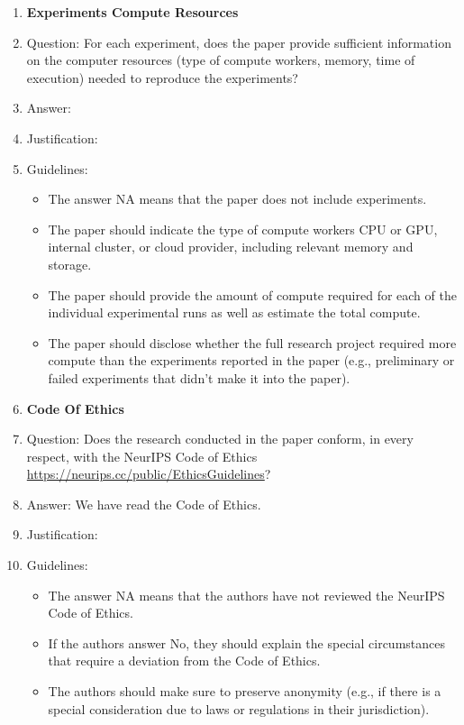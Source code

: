 \begin{enumerate}
\item {\bf Experiments Compute Resources}
\item[] Question: For each experiment, does the paper provide sufficient information on the computer resources (type of compute workers, memory, time of execution) needed to reproduce the experiments?
\item[] Answer: \answerYes{} %
\item[] Justification: \justificationTODO{}
\item[] Guidelines:
  \begin{itemize}
  \item The answer NA means that the paper does not include experiments.
  \item The paper should indicate the type of compute workers CPU or GPU, internal cluster, or cloud provider, including relevant memory and storage.
  \item The paper should provide the amount of compute required for each of the individual experimental runs as well as estimate the total compute.
  \item The paper should disclose whether the full research project required more compute than the experiments reported in the paper (e.g., preliminary or failed experiments that didn't make it into the paper).
  \end{itemize}

\item {\bf Code Of Ethics}
\item[] Question: Does the research conducted in the paper conform, in every respect, with the NeurIPS Code of Ethics \url{https://neurips.cc/public/EthicsGuidelines}?
\item[] Answer: \answerYes{} We have read the Code of Ethics.  %
\item[] Justification: \justificationTODO{}
\item[] Guidelines:
  \begin{itemize}
  \item The answer NA means that the authors have not reviewed the NeurIPS Code of Ethics.
  \item If the authors answer No, they should explain the special circumstances that require a deviation from the Code of Ethics.
  \item The authors should make sure to preserve anonymity (e.g., if there is a special consideration due to laws or regulations in their jurisdiction).
  \end{itemize}



\end{enumerate}
